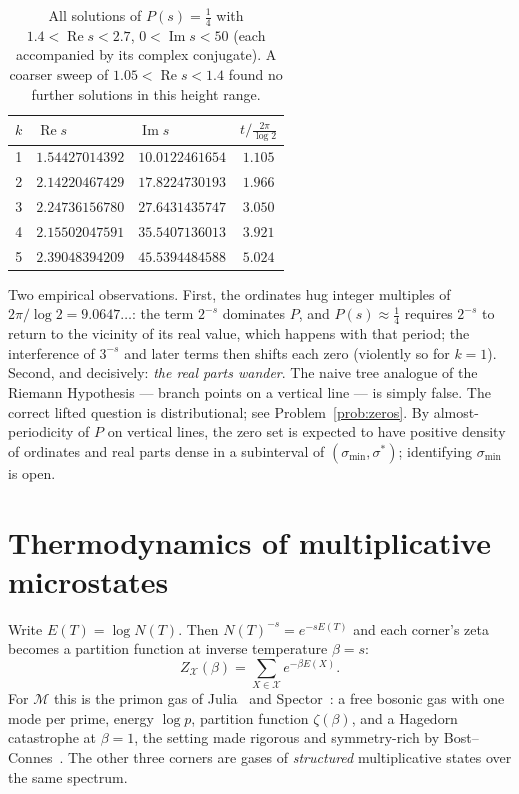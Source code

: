 \documentclass[11pt]{article}
\newcommand{\cM}{\mathcal{M}}   %
\numberwithin{equation}{section}
\theoremstyle{plain}
\theoremstyle{definition}
\theoremstyle{remark}
\begin{document}
\begin{table}[ht]
\centering
\begin{tabular}{@{}cllc@{}}
\toprule
$k$ & $\operatorname{Re} s$ & $\operatorname{Im} s$ & $t \big/ \tfrac{2\pi}{\log 2}$ \\
\midrule
1 & $1.54427014392$ & $10.0122461654$ & $1.105$ \\
2 & $2.14220467429$ & $17.8224730193$ & $1.966$ \\
3 & $2.24736156780$ & $27.6431435747$ & $3.050$ \\
4 & $2.15502047591$ & $35.5407136013$ & $3.921$ \\
5 & $2.39048394209$ & $45.5394484588$ & $5.024$ \\
\bottomrule
\end{tabular}
\caption{All solutions of $P(s) = \tfrac14$ with $1.4 < \operatorname{Re} s < 2.7$,
$0 < \operatorname{Im} s < 50$ (each accompanied by its complex conjugate). A coarser
sweep of $1.05 < \operatorname{Re} s < 1.4$ found no further solutions in this height
range.}
\label{tab:zeros}
\end{table}

Two empirical observations. First, the ordinates hug integer multiples of
$2\pi/\log 2 = 9.0647\dots$: the term $2^{-s}$ dominates $P$, and $P(s) \approx \tfrac14$
requires $2^{-s}$ to return to the vicinity of its real value, which happens with that
period; the interference of $3^{-s}$ and later terms then shifts each zero (violently so
for $k=1$). Second, and decisively: \emph{the real parts wander}. The naive tree
analogue of the Riemann Hypothesis --- branch points on a vertical line --- is simply
false. The correct lifted question is distributional; see Problem~\ref{prob:zeros}.
By almost-periodicity of $P$ on vertical lines, the zero set is expected to have
positive density of ordinates and real parts dense in a subinterval of
$(\sigma_{\min}, \sigma^{*})$; identifying $\sigma_{\min}$ is open.

\section{Thermodynamics of multiplicative microstates}\label{sec:thermo}

Write $E(T) = \log N(T)$. Then $N(T)^{-s} = e^{-sE(T)}$ and each corner's zeta becomes a
partition function at inverse temperature $\beta = s$:
\[
Z_{\mathcal X}(\beta) = \sum_{X \in \mathcal X} e^{-\beta E(X)}.
\]
For $\cM$ this is the primon gas of Julia~\cite{julia} and Spector~\cite{spector}: a
free bosonic gas with one mode per prime, energy $\log p$, partition function
$\zeta(\beta)$, and a Hagedorn catastrophe at $\beta = 1$, the setting made rigorous and
symmetry-rich by Bost--Connes~\cite{bostconnes}. The other three corners are gases of
\emph{structured} multiplicative states over the same spectrum.
\end{document}
